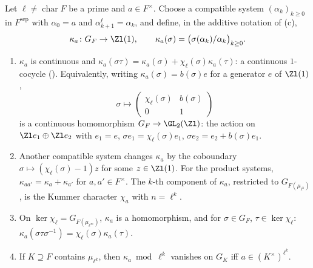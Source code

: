 \begin{proposition}\label{prop:galois:l-adic-kummer}
Let $\ell\ne\operatorname{char}F$ be a prime and $a\in F^\times$. Choose a compatible system $(\alpha_k)_{k\ge0}$ in $F^{\mathrm{sep}}$ with $\alpha_0=a$ and
$\alpha_{k+1}^\ell=\alpha_k$, and define, in the additive notation of (c),
\[
\kappa_a\colon G_F\to\Zl(1),\qquad\kappa_a(\sigma)=\bigl(\sigma(\alpha_k)/\alpha_k\bigr)_{k\ge0}.
\]
\begin{enumerate}[label=(\alph*)]
\item $\kappa_a$ is continuous and $\kappa_a(\sigma\tau)=\kappa_a(\sigma)+\chi_\ell(\sigma)\kappa_a(\tau)$: a continuous $1$-cocycle (). Equivalently, writing
$\kappa_a(\sigma)=b(\sigma)e$ for a generator $e$ of $\Zl(1)$,
\[
\sigma\longmapsto\begin{pmatrix}\chi_\ell(\sigma)&b(\sigma)\\0&1\end{pmatrix}
\]
is a continuous homomorphism $G_F\to\GL_2(\Zl)$: the action on $\Zl e_1\oplus\Zl e_2$ with $e_1=e$, $\sigma e_1=\chi_\ell(\sigma)e_1$, $\sigma e_2=e_2+b(\sigma)e_1$.
\item Another compatible system changes $\kappa_a$ by the coboundary $\sigma\mapsto(\chi_\ell(\sigma)-1)z$ for some $z\in\Zl(1)$. For the product systems,
$\kappa_{aa'}=\kappa_a+\kappa_{a'}$ for $a,a'\in F^\times$. The $k$-th component of $\kappa_a$, restricted to $G_{F(\mu_{\ell^k})}$, is the Kummer character $\chi_a$ with $n=\ell^k$.
\item On $\ker\chi_\ell=G_{F(\mu_{\ell^\infty})}$, $\kappa_a$ is a homomorphism, and for $\sigma\in G_F$, $\tau\in\ker\chi_\ell$:
$\kappa_a(\sigma\tau\sigma^{-1})=\chi_\ell(\sigma)\kappa_a(\tau)$.
\item If $K\supseteq F$ contains $\mu_{\ell^k}$, then $\kappa_a\bmod\ell^k$ vanishes on $G_K$ iff $a\in(K^\times)^{\ell^k}$.
\end{enumerate}
\end{proposition}

